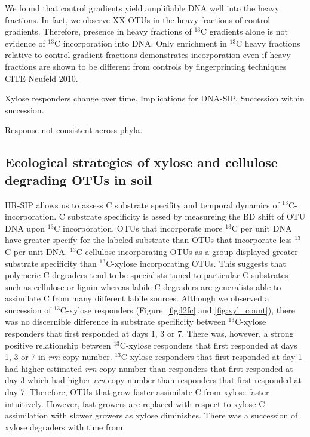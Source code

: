 We found that control gradients yield amplifiable DNA well into the heavy
fractions. In fact, we observe XX OTUs in the heavy fractions of control
gradients. Therefore, presence in heavy fractions of $^{13}$C gradients alone
is not evidence of $^{13}$C incorporation into DNA. Only enrichment in
$^{13}$C heavy fractions relative to control gradient fractions demonstrates
incorporation even if heavy fractions are shown to be different from controls
by fingerprinting techniques CITE Neufeld 2010.

Xylose responders change over time. Implications for DNA-SIP. Succession within
succession.

Response not consistent across phyla.

\subsection{Ecological strategies of xylose and cellulose degrading OTUs in soil}
HR-SIP allows us to assess C substrate specifity and temporal dynamics of
$^{13}$C-incorporation. C substrate specificity is assed by measureing the 
BD shift of OTU DNA upon $^{13}$C incorporation. OTUs that incorporate more
$^{13}$C per unit DNA have greater specify for the labeled substrate than
OTUs that incorporate less $^{13}$C per unit DNA. $^{13}$C-cellulose 
incorporating OTUs as a group displayed greater substrate specificity than
$^{13}$C-xylose incorporating OTUs. This suggests that polymeric C-degraders
tend to be specialists tuned to particular C-substrates such as cellulose
or lignin whereas labile C-degraders are generalists able to assimilate
C from many different labile sources. Although we observed a succession of 
$^{13}$C-xylose responders (Figure~\ref{fig:l2fc} and \ref{fig:xyl_count}), 
there was no discernible difference in substrate specificity between 
$^{13}$C-xylose responders that first responded at days 1, 3 or 7. There was,
however, a strong positive relationship between $^{13}$C-xylose responders that
first responded at days 1, 3 or 7 in \textit{rrn} copy number. $^{13}$C-xylose 
responders that first responded at day 1 had higher estimated \textit{rrn} copy 
number than responders that first responded at day 3 which had higher \textit{rrn}
copy number than responders that first responded at day 7. Therefore, OTUs that 
grow faster assimilate C from xylose faster intuitively. However, fast growers
are replaced with respect to xylose C assimilation with slower growers as
xylose diminishes. There was a succession of xylose degraders with time from
